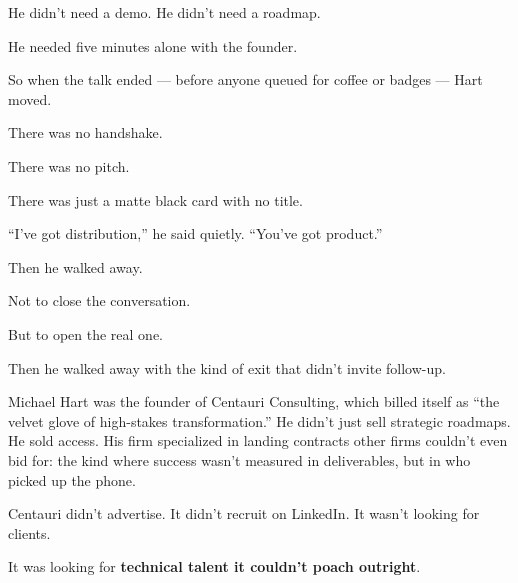 He didn’t need a demo. 
He didn’t need a roadmap.

He needed five minutes alone with the founder.

So when the talk ended --- before anyone queued for coffee or badges --- Hart moved.

There was no handshake. 

There was no pitch. 

There was just a matte black card with no title.

``I’ve got distribution,'' 
he said quietly. 
``You’ve got product.''

Then he walked away.

Not to close the conversation.

But to open the real one.

Then he walked away with the kind of exit that didn’t invite follow-up.





Michael Hart was the founder of Centauri Consulting, which billed itself as 
``the velvet glove of high-stakes transformation.''
He didn’t just sell strategic roadmaps. He sold access. His firm specialized in landing contracts other firms 
couldn’t even bid for: the kind where success wasn’t measured in deliverables, but in who picked up the phone.

Centauri didn’t advertise. It didn’t recruit on LinkedIn. It wasn’t looking for clients.

It was looking for \textbf{technical talent it couldn’t poach outright}.


\medskip


